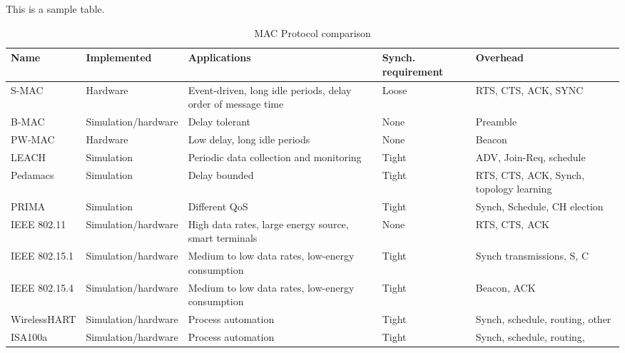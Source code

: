 This is a sample table.

\begin{table}[]
\centering
\caption{MAC Protocol comparison}
\label{mac-comparison-table}
\begin{adjustbox}{max width=\textwidth}
\begin{tabular}{lllll}
\hline
Name          & Implemented         & Applications                                                 & Synch. requirement & Overhead                                \\ \hline
S-MAC         & Hardware            & Event-driven, long idle periods, delay order of message time & Loose              & RTS, CTS, ACK, SYNC                     \\
B-MAC         & Simulation/hardware & Delay tolerant                                               & None               & Preamble                                \\
PW-MAC        & Hardware            & Low delay, long idle periods                                 & None               & Beacon                                  \\
LEACH         & Simulation          & Periodic data collection and monitoring                      & Tight              & ADV, Join-Req, schedule                 \\
Pedamacs      & Simulation          & Delay bounded                                                & Tight              & RTS, CTS, ACK, Synch, topology learning \\
PRIMA         & Simulation          & Different QoS                                                & Tight              & Synch, Schedule, CH election            \\
IEEE 802.11   & Simulation/hardware & High data rates, large energy source, smart terminals        & None               & RTS, CTS, ACK                           \\
IEEE 802.15.1 & Simulation/hardware & Medium to low data rates, low-energy consumption             & Tight              & Synch transmissions, S, C               \\
IEEE 802.15.4 & Simulation/hardware & Medium to low data rates, low-energy consumption             & Tight              & Beacon, ACK                             \\
WirelessHART  & Simulation/hardware & Process automation                                           & Tight              & Synch, schedule, routing, other         \\
ISA100a       & Simulation/hardware & Process automation                                           & Tight              & Synch, schedule, routing,               \\ \hline
\end{tabular}
\end{adjustbox}
\end{table}





